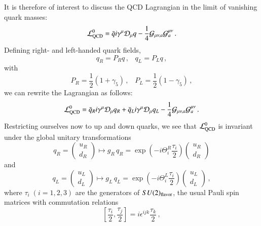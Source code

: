\documentclass[sort&compress,preprint,3p]{elsarticle}
\begin{document}
It is therefore of interest to discuss the
QCD Lagrangian in the limit of vanishing quark
masses:
\begin{equation}
{\cal L}_{\rm QCD}^0 = \bar{q} i \gamma^\mu {\cal D}_\mu
q - \frac14 
{\cal G}_{\mu\nu,a}
{\cal G}^{\mu\nu}_{a} \,.
\end{equation}
Defining right- and left-handed quark fields,
\begin{equation}
q_R=P_Rq \,, \;\;\;
q_L=P_Lq \,,
\end{equation}
with 
\begin{equation}
P_R=\frac12(1+\gamma_5) \,, \;\;\;
P_L=\frac12(1-\gamma_5) \,,
\end{equation}
we can rewrite the Lagrangian as follows:
\begin{equation}
{\cal L}_{\rm QCD}^0 = 
\bar{q}_R i \gamma^\mu {\cal D}_\mu q_R 
+\bar{q}_L i \gamma^\mu {\cal D}_\mu q_L 
- \frac14 
{\cal G}_{\mu\nu,a}
{\cal G}^{\mu\nu}_{a} \, .
\end{equation}
Restricting ourselves now to
up and down quarks,
we see that
${\cal L}_{\rm QCD}^0$ 
is invariant under the global unitary transformations
\begin{equation}
q_R =
\left( \begin{array}{c}
u_R \\ d_R
\end{array} \right)
\longmapsto
g_R \, q_R =
\exp
\left(
-i \Theta_i^R \frac{\tau_i}{2}
\right)
\left( \begin{array}{c}
u_R \\ d_R
\end{array} \right) 
\label{eq_gR}
\end{equation}
and
\begin{equation}
q_L =
\left( \begin{array}{c}
u_L \\ d_L
\end{array} \right)
\longmapsto
g_L \, q_L =
\exp
\left(
-i \Theta_i^L \frac{\tau_i}{2}
\right)
\left( \begin{array}{c}
u_L \\ d_L
\end{array} \right) 
\,,
\label{eq_gL}
\end{equation}
where $\tau_i \; (i=1,2,3)$ 
are the generators of $SU(2)_{\rm flavor}$,
the usual Pauli spin matrices with commutation relations
\begin{equation}
\left[\frac{\tau_i}{2},\frac{\tau_j}{2} \right]
= i\epsilon^{ijk}\frac{\tau_k}{2}
\,,
\end{equation}
\end{document}
